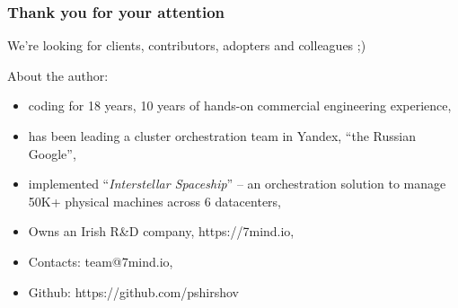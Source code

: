 \documentclass{beamer}
\begin{document}
\begin{frame}
    \frametitle{Thank you for your attention}

    \begin{center}
      We're looking for clients, contributors, adopters and colleagues ;)
    \end{center}

    About the author:
    \begin{itemize}
        \item coding for 18 years, 10 years of hands-on commercial engineering experience,
        \item has been leading a cluster orchestration team in Yandex, ``the Russian Google'',
        \item implemented ``\textit{Interstellar Spaceship}'' -- an orchestration solution to manage 50K+ physical machines across 6 datacenters,
        \item Owns an Irish R\&D company, https://7mind.io,
        \item Contacts: team@7mind.io,
        \item Github: https://github.com/pshirshov
    \end{itemize}
\end{frame}
\end{document}
